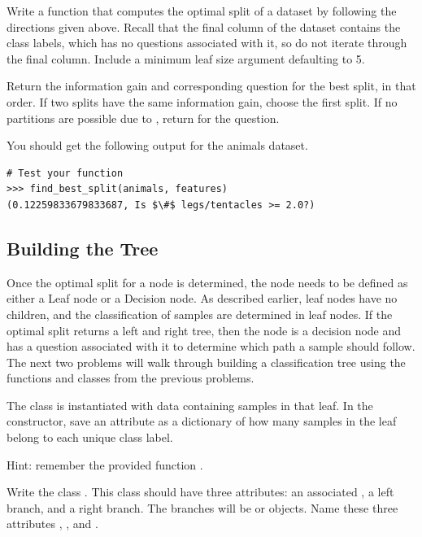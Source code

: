 \begin{problem}
Write a function  that computes the optimal split of a dataset by following the directions given above.
Recall that the final column of the dataset contains the class labels, which has no questions associated with it, so do not iterate through the final column.
Include a minimum leaf size argument  defaulting to 5.

Return the information gain and corresponding question for the best split, in that order.
If two splits have the same information gain, choose the first split.
If no partitions are possible due to , return  for the question.

\noindent You should get the following output for the animals dataset.
\begin{lstlisting}[mathescape=true]
# Test your function
>>> find_best_split(animals, features)
(0.12259833679833687, Is $\#$ legs/tentacles >= 2.0?)
\end{lstlisting}
\end{problem}

\subsection*{Building the Tree}
Once the optimal split for a node is determined, the node needs to be defined as either a Leaf node or a Decision node. 
As described earlier, leaf nodes have no children, and the classification of samples are determined in leaf nodes.
If the optimal split returns a left and right tree, then the node is a decision node and has a question associated with it to determine which path a sample should follow.
The next two problems will walk through building a classification tree using the functions and classes from the previous problems.

\begin{problem}
The class  is instantiated with data containing samples in that leaf. 
In the constructor, save an attribute  as a dictionary of how many samples in the leaf belong to each unique class label.

\noindent Hint: remember the provided function .

Write the class .
This class should have three attributes: an associated , a left branch, and a right branch.
The branches will be  or  objects.
Name these three attributes , , and .
\end{problem}

